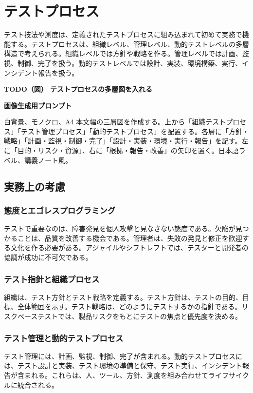 \documentclass[uplatex,dvipdfmx,a4paper,11pt,nomag]{jsarticle}
\newenvironment{todobox}[2]{\par\medskip\begin{framed}\noindent\textbf{TODO（図） #1}\par\smallskip\noindent\textbf{画像生成用プロンプト}\par\smallskip\noindent #2\par\smallskip}{\end{framed}\par\medskip}
\begin{document}
\section{テストプロセス}
テスト技法や測度は、定義されたテストプロセスに組み込まれて初めて実務で機能する。テストプロセスは、組織レベル、管理レベル、動的テストレベルの多層構造で考えられる。組織レベルでは方針や戦略を作る。管理レベルでは計画、監視、制御、完了を扱う。動的テストレベルでは設計、実装、環境構築、実行、インシデント報告を扱う。

\begin{todobox}{テストプロセスの多層図を入れる}{白背景、モノクロ、A4 本文幅の三層図を作成する。上から「組織テストプロセス」「テスト管理プロセス」「動的テストプロセス」を配置する。各層に「方針・戦略」「計画・監視・制御・完了」「設計・実装・環境・実行・報告」を記す。左に「目的・リスク・資源」、右に「根拠・報告・改善」の矢印を置く。日本語ラベル、講義ノート風。}
\end{todobox}

\subsection{実務上の考慮}
\subsubsection{態度とエゴレスプログラミング}
テストで重要なのは、障害発見を個人攻撃と見なさない態度である。欠陥が見つかることは、品質を改善する機会である。管理者は、失敗の発見と修正を歓迎する文化を作る必要がある。アジャイルやシフトレフトでは、テスターと開発者の協調が成功に不可欠である。

\subsubsection{テスト指針と組織プロセス}
組織は、テスト方針とテスト戦略を定義する。テスト方針は、テストの目的、目標、全体範囲を示す。テスト戦略は、どのようにテストするかの指針である。リスクベーステストでは、製品リスクをもとにテストの焦点と優先度を決める。

\subsubsection{テスト管理と動的テストプロセス}
テスト管理には、計画、監視、制御、完了が含まれる。動的テストプロセスには、テスト設計と実装、テスト環境の準備と保守、テスト実行、インシデント報告が含まれる。これらは、人、ツール、方針、測度を組み合わせてライフサイクルに統合される。
\end{document}
